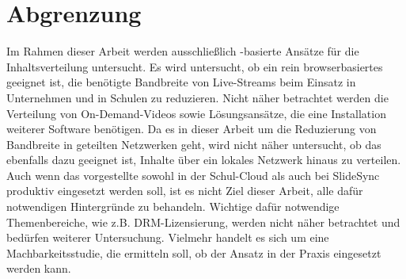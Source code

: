 \chapter{Abgrenzung}\label{ch:demarcation}

Im Rahmen dieser Arbeit werden ausschließlich \pTp-basierte Ansätze für die Inhaltsverteilung untersucht. Es wird untersucht, ob ein rein browserbasiertes \cdn geeignet ist, die benötigte Bandbreite von Live-Streams beim Einsatz in Unternehmen und in Schulen zu reduzieren. Nicht näher betrachtet werden die Verteilung von On-Demand-Videos sowie Lösungsansätze, die eine Installation weiterer Software benötigen. Da es in dieser Arbeit um die Reduzierung von Bandbreite in geteilten Netzwerken geht, wird nicht näher untersucht, ob das \cdn ebenfalls dazu geeignet ist, Inhalte über ein lokales Netzwerk hinaus zu verteilen. Auch wenn das vorgestellte \cdn sowohl in der Schul-Cloud als auch bei SlideSync produktiv eingesetzt werden soll, ist es nicht Ziel dieser Arbeit, alle dafür notwendigen Hintergründe zu behandeln. Wichtige dafür notwendige Themenbereiche, wie z.B. DRM-Lizensierung, werden nicht näher betrachtet und bedürfen weiterer Untersuchung. Vielmehr handelt es sich um eine Machbarkeitsstudie, die ermitteln soll, ob der Ansatz in der Praxis eingesetzt werden kann.
